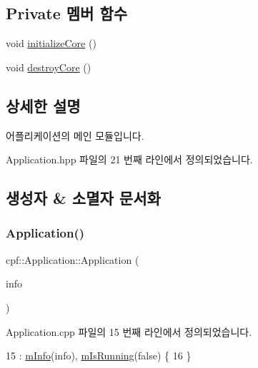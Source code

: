 \subsection*{Private 멤버 함수}
\begin{DoxyCompactItemize}
\item 
void \hyperlink{classcpf_1_1_application_a676898244f732414360ced11ed65379c}{initialize\+Core} ()
\item 
void \hyperlink{classcpf_1_1_application_aa65f415f1e0866cab063d83ab428ebbc}{destroy\+Core} ()
\end{DoxyCompactItemize}


\subsection{상세한 설명}
어플리케이션의 메인 모듈입니다. 

Application.\+hpp 파일의 21 번째 라인에서 정의되었습니다.



\subsection{생성자 \& 소멸자 문서화}
\mbox{\label{classcpf_1_1_application_a82aea6d89660d4ae9898a437f96d2e42}} 
\subsubsection{\texorpdfstring{Application()}{Application()}}
{\footnotesize\ttfamily cpf\+::\+Application\+::\+Application (\begin{DoxyParamCaption}\item[{const \hyperlink{structcpf_1_1_application_create_info}{Application\+Create\+Info} \&}]{info }\end{DoxyParamCaption})}



Application.\+cpp 파일의 15 번째 라인에서 정의되었습니다.


\begin{DoxyCode}
15                                                               : \hyperlink{classcpf_1_1_application_aeef620fe71f2ac891e3650d6d3462b28}{mInfo}(info), 
      \hyperlink{classcpf_1_1_application_a84a6e2bafcc39719acee9885a064ac75}{mIsRunning}(\textcolor{keyword}{false}) \{
16     \}
\end{DoxyCode}
\mbox{\label{classcpf_1_1_application_ad018a98c533cbf877ae11a05b329c4a2}} 

